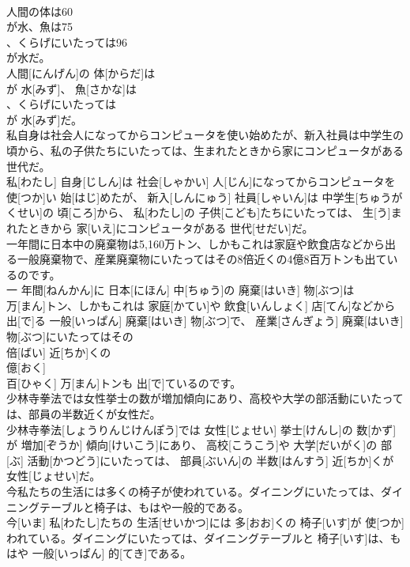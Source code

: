 \documentclass[8pt]{extreport}
\begin{document}
\begin{CJK}{UTF8}{min}
\\	人間の体は60
\\	が水、魚は75
\\	、くらげにいたっては96
\\	が水だ。	
\\	人間[にんげん]の 体[からだ]は 
\\	が 水[みず]、 魚[さかな]は 
\\	、くらげにいたっては 
\\	が 水[みず]だ。
\\	私自身は社会人になってからコンピュータを使い始めたが、新入社員は中学生の頃から、私の子供たちにいたっては、生まれたときから家にコンピュータがある世代だ。	
\\	私[わたし] 自身[じしん]は 社会[しゃかい] 人[じん]になってからコンピュータを 使[つか]い 始[はじ]めたが、 新入[しんにゅう] 社員[しゃいん]は 中学生[ちゅうがくせい]の 頃[ころ]から、 私[わたし]の 子供[こども]たちにいたっては、 生[う]まれたときから 家[いえ]にコンピュータがある 世代[せだい]だ。
\\	一年間に日本中の廃棄物は5,160万トン、しかもこれは家庭や飲食店などから出る一般廃棄物で、産業廃棄物にいたってはその8倍近くの4億8百万トンも出ているのです。	
\\	一 年間[ねんかん]に 日本[にほん] 中[ちゅう]の 廃棄[はいき] 物[ぶつ]は 
\\	万[まん]トン、しかもこれは 家庭[かてい]や 飲食[いんしょく] 店[てん]などから 出[で]る 一般[いっぱん] 廃棄[はいき] 物[ぶつ]で、 産業[さんぎょう] 廃棄[はいき] 物[ぶつ]にいたってはその 
\\	倍[ばい] 近[ちか]くの 
\\	億[おく] 
\\	百[ひゃく] 万[まん]トンも 出[で]ているのです。
\\	少林寺拳法では女性挙士の数が増加傾向にあり、高校や大学の部活動にいたっては、部員の半数近くが女性だ。	
\\	少林寺拳法[しょうりんじけんぽう]では 女性[じょせい] 挙士[けんし]の 数[かず]が 増加[ぞうか] 傾向[けいこう]にあり、 高校[こうこう]や 大学[だいがく]の 部[ぶ] 活動[かつどう]にいたっては、 部員[ぶいん]の 半数[はんすう] 近[ちか]くが 女性[じょせい]だ。
\\	今私たちの生活には多くの椅子が使われている。ダイニングにいたっては、ダイニングテーブルと椅子は、もはや一般的である。	
\\	今[いま] 私[わたし]たちの 生活[せいかつ]には 多[おお]くの 椅子[いす]が 使[つか]われている。ダイニングにいたっては、ダイニングテーブルと 椅子[いす]は、もはや 一般[いっぱん] 的[てき]である。

\end{CJK}
\end{document}
